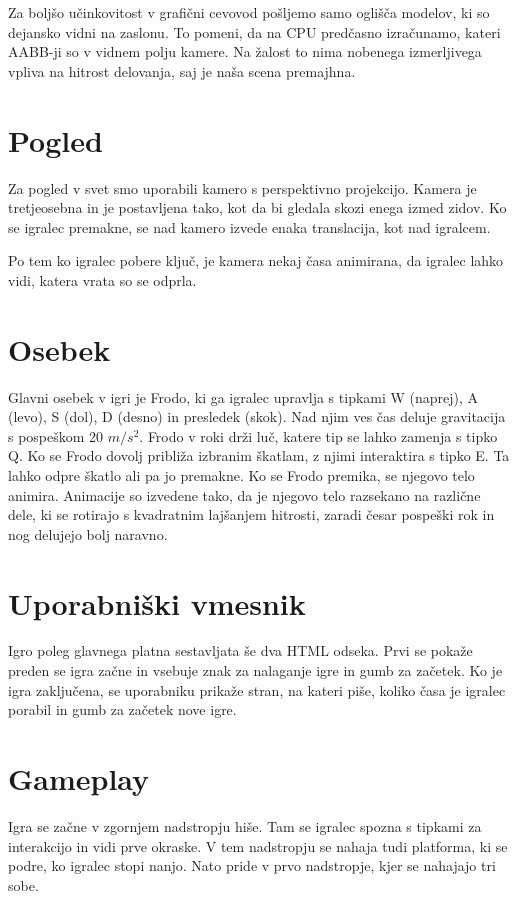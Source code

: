\documentclass[a4paper,12pt]{article}
\begin{document}
Za boljšo učinkovitost v grafični cevovod pošljemo samo oglišča modelov, ki so dejansko vidni na zaslonu. To pomeni, da na CPU predčasno izračunamo, kateri AABB-ji so v vidnem polju kamere. Na žalost to nima nobenega izmerljivega vpliva na hitrost delovanja, saj je naša scena premajhna.

\section{Pogled}
Za pogled v svet smo uporabili kamero s perspektivno projekcijo. Kamera je tretjeosebna in je postavljena tako, kot da bi gledala skozi enega izmed zidov. Ko se igralec premakne, se nad kamero izvede enaka translacija, kot nad igralcem.

Po tem ko igralec pobere ključ, je kamera nekaj časa animirana, da igralec lahko vidi, katera vrata so se odprla.

\section{Osebek}
 Glavni osebek v igri je Frodo, ki ga igralec upravlja s tipkami W (naprej), A (levo), S (dol), D (desno) in presledek (skok). Nad njim ves čas deluje gravitacija s pospeškom 20 \(m/s^{2} \). Frodo v roki drži luč, katere tip se lahko zamenja s tipko Q. Ko se Frodo dovolj približa izbranim škatlam, z njimi interaktira s tipko E. Ta lahko odpre škatlo ali pa jo premakne.
Ko se Frodo premika, se njegovo telo animira. Animacije so izvedene tako, da je njegovo telo razsekano na različne dele, ki se rotirajo s kvadratnim lajšanjem hitrosti, zaradi česar pospeški rok in nog delujejo bolj naravno.

\section{Uporabniški vmesnik}
\noindent Igro poleg glavnega platna sestavljata še dva HTML odseka. Prvi se pokaže preden se igra začne in vsebuje znak za nalaganje igre in gumb za začetek. Ko je igra zaključena, se uporabniku prikaže stran, na kateri piše, koliko časa je igralec porabil in gumb za začetek nove igre.

\section{Gameplay}
Igra se začne v zgornjem nadstropju hiše. Tam se igralec spozna s tipkami za interakcijo in vidi prve okraske. V tem nadstropju se nahaja tudi platforma, ki se podre, ko igralec stopi nanjo. Nato pride v prvo nadstropje, kjer se nahajajo tri sobe.
\end{document}
